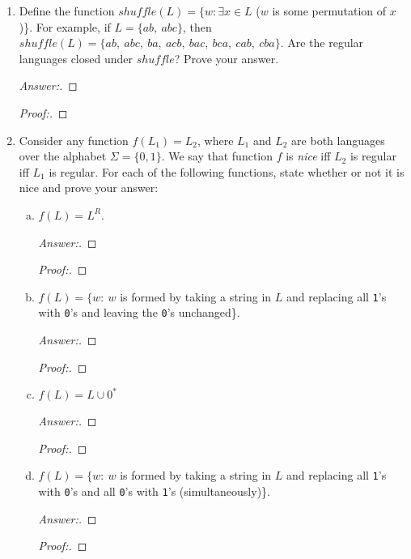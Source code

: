 \documentclass[10pt]{article}
\begin{document}
\begin{enumerate}[1)]
\item
Define the function $shuffle(L) = \{w : \exists x \in L$ ($w$ is some permutation of $x$)\}.  For example, if $L = \{ab,\ abc\}$, then $shuffle(L) = \{ab,\ abc,\ ba,\ acb,\ bac,\ bca,\ cab,\ cba\}$.  Are the regular languages closed under $shuffle$?  Prove your answer.
\begin{proof}[Answer:]
\end{proof}
\begin{proof}[Proof:]
\end{proof}

\item
Consider any function $f(L_1) = L_2$, where $L_1$ and $L_2$ are both languages over the alphabet $\Sigma = \{0, 1\}$.  We say that function $f$ is \textit{nice} iff  $L_2$ is regular iff $L_1$ is regular.  For each of the following functions, state whether or not it is nice and prove your answer:

\begin{enumerate}[a)]
\item
$f(L) = L^R$.
\begin{proof}[Answer:]
\end{proof}
\begin{proof}[Proof:]
\end{proof}

\item
$f(L)  =  \{w:\ w$ is formed by taking a string in $L$ and replacing all  \texttt{1}'s with  \texttt{0}'s and leaving the  \texttt{0}'s unchanged\}.
\begin{proof}[Answer:]
\end{proof}
\begin{proof}[Proof:]
\end{proof}

\item
$f(L) = L \cup 0^*$
\begin{proof}[Answer:]
\end{proof}
\begin{proof}[Proof:]
\end{proof}

\item
$f(L)  =  \{w:\ w$ is formed by taking a string in $L$ and replacing all \texttt{1}'s with  \texttt{0}'s and all  \texttt{0}'s with  \texttt{1}'s (simultaneously)\}.
\begin{proof}[Answer:]
\end{proof}
\begin{proof}[Proof:]
\end{proof}


\end{enumerate}
\end{enumerate}
\end{document}
